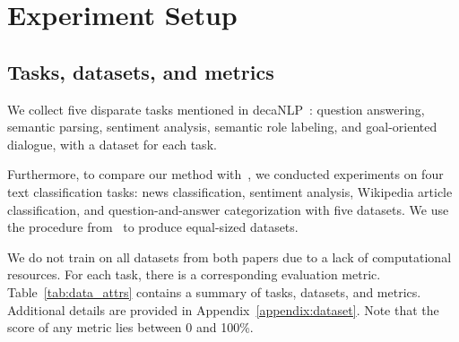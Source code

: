 \documentclass{article} %
\begin{document}

\section{Experiment Setup} \label{sec:expsetup}

\subsection{Tasks, datasets, and metrics} 

We collect five disparate tasks mentioned in decaNLP~\citep{McCann2018decaNLP}: question answering, semantic parsing, sentiment analysis, semantic role labeling, and goal-oriented dialogue, with a dataset for each task.

Furthermore, to compare our method with~\citet{d2019episodic}, we conducted experiments on four text classification tasks: news classification, sentiment analysis, Wikipedia article classification, and question-and-answer categorization with five datasets. We use the procedure from~\citet{d2019episodic} to produce equal-sized datasets.

We do not train on all datasets from both papers due to a lack of computational resources.
For each task, there is a corresponding evaluation metric.
Table~\ref{tab:data_attrs} contains a summary of tasks, datasets, and metrics.
Additional details are provided in Appendix~\ref{appendix:dataset}.
Note that the score of any metric lies between 0 and 100\%.
\end{document}
